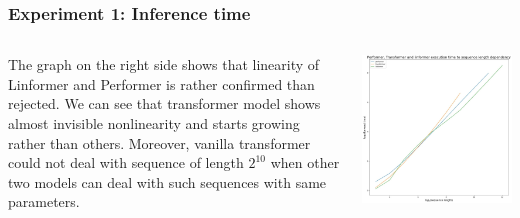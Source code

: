 \documentclass[9pt]{beamer}%
\begin{document}
\begin{frame}
	\frametitle{Experiment 1: Inference time}
	\begin{columns}
		The graph on the right side shows that linearity of Linformer and Performer is rather confirmed than rejected. We can see that transformer model shows almost invisible nonlinearity and starts growing rather than others. Moreover, vanilla transformer could not deal with sequence of length $2^{10}$ when other two models can deal with such sequences with same parameters.
		
		\includegraphics[scale=0.4]{tflfpf_time}
	\end{columns}
	
\end{frame}
\end{document}
